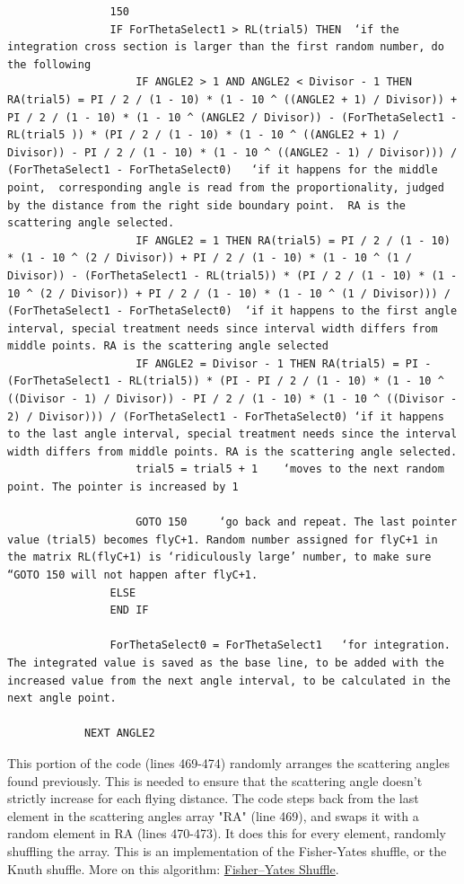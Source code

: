 \documentclass[10pt, reqno]{exam}
\begin{document}
\begin{verbatim}
                150
                IF ForThetaSelect1 > RL(trial5) THEN  ‘if the integration cross section is larger than the first random number, do the following
                    IF ANGLE2 > 1 AND ANGLE2 < Divisor - 1 THEN RA(trial5) = PI / 2 / (1 - 10) * (1 - 10 ^ ((ANGLE2 + 1) / Divisor)) + PI / 2 / (1 - 10) * (1 - 10 ^ (ANGLE2 / Divisor)) - (ForThetaSelect1 - RL(trial5 )) * (PI / 2 / (1 - 10) * (1 - 10 ^ ((ANGLE2 + 1) / Divisor)) - PI / 2 / (1 - 10) * (1 - 10 ^ ((ANGLE2 - 1) / Divisor))) / (ForThetaSelect1 - ForThetaSelect0)   ‘if it happens for the middle point,  corresponding angle is read from the proportionality, judged by the distance from the right side boundary point.  RA is the scattering angle selected.
                    IF ANGLE2 = 1 THEN RA(trial5) = PI / 2 / (1 - 10) * (1 - 10 ^ (2 / Divisor)) + PI / 2 / (1 - 10) * (1 - 10 ^ (1 / Divisor)) - (ForThetaSelect1 - RL(trial5)) * (PI / 2 / (1 - 10) * (1 - 10 ^ (2 / Divisor)) + PI / 2 / (1 - 10) * (1 - 10 ^ (1 / Divisor))) / (ForThetaSelect1 - ForThetaSelect0)  ‘if it happens to the first angle interval, special treatment needs since interval width differs from middle points. RA is the scattering angle selected
                    IF ANGLE2 = Divisor - 1 THEN RA(trial5) = PI - (ForThetaSelect1 - RL(trial5)) * (PI - PI / 2 / (1 - 10) * (1 - 10 ^ ((Divisor - 1) / Divisor)) - PI / 2 / (1 - 10) * (1 - 10 ^ ((Divisor - 2) / Divisor))) / (ForThetaSelect1 - ForThetaSelect0) ‘if it happens to the last angle interval, special treatment needs since the interval width differs from middle points. RA is the scattering angle selected.
                    trial5 = trial5 + 1    ‘moves to the next random point. The pointer is increased by 1 
    
                    GOTO 150     ‘go back and repeat. The last pointer value (trial5) becomes flyC+1. Random number assigned for flyC+1 in the matrix RL(flyC+1) is ‘ridiculously large’ number, to make sure “GOTO 150 will not happen after flyC+1. 
                ELSE
                END IF
    
                ForThetaSelect0 = ForThetaSelect1   ‘for integration. The integrated value is saved as the base line, to be added with the increased value from the next angle interval, to be calculated in the next angle point. 
    
            NEXT ANGLE2
\end{verbatim}

This portion of the code (lines 469-474) randomly arranges the scattering angles found previously. This is needed to ensure that the scattering angle doesn't strictly increase for each flying distance. The code steps back from the last element in the scattering angles array "RA" (line 469), and swaps it with a random element in RA (lines 470-473). It does this for every element, randomly shuffling the array. This is an implementation of the Fisher-Yates shuffle, or the Knuth shuffle. More on this algorithm: \href{https://en.wikipedia.org/wiki/Fisher%E2%80%93Yates_shuffle}{Fisher--Yates Shuffle}. \par
\end{document}
